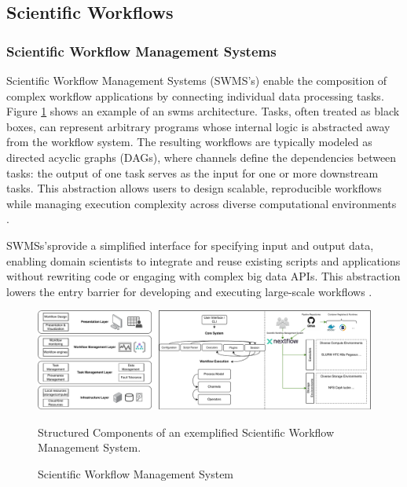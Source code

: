 \subsection{Scientific Workflows}
\label{sec:background_workflows}
\subsubsection{Scientific Workflow Management Systems}
\label{sec:background_workflows_swms}
Scientific Workflow Management Systems (SWMS's) enable the composition of complex workflow applications by connecting individual data processing tasks. Figure \ref{fig:02-swms} shows an example of an swms architecture. Tasks, often treated as black boxes, can represent arbitrary programs whose internal logic is abstracted away from the workflow system. The resulting workflows are typically modeled as directed acyclic graphs (DAGs), where channels define the dependencies between tasks: the output of one task serves as the input for one or more downstream tasks. This abstraction allows users to design scalable, reproducible workflows while managing execution complexity across diverse computational environments \cite{thamsen2025energyawareworkflowexecutionoverview}.

SWMSs'sprovide a simplified interface for specifying input and output data, enabling domain scientists to integrate and reuse existing scripts and applications without rewriting code or engaging with complex big data APIs. This abstraction lowers the entry barrier for developing and executing large-scale workflows \cite{Bader_2022}.

\begin{figure}[H]
    \centering
    \includegraphics[scale=0.45]{fig/02/02-swms.pdf}
    \caption{Scientific Workflow Management System}
    \label{fig:02-swms}
    \tiny
    Structured Components of an exemplified Scientific Workflow Management System.
\end{figure}

